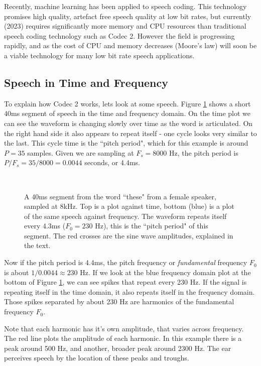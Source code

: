 \documentclass{article}
\begin{document}
{Recently, machine learning has been applied to speech coding.  This technology promises high quality, artefact free speech quality at low bit rates, but currently (2023) requires significantly more memory and CPU resources than traditional speech coding technology such as Codec 2.  However the field is progressing rapidly, and as the cost of CPU and memory decreases (Moore's law) will soon be a viable technology for many low bit rate speech applications.

\subsection{Speech in Time and Frequency}

To explain how Codec 2 works, lets look at some speech. Figure \ref{fig:hts2a_time} shows a short 40ms segment of speech in the time and frequency domain.  On the time plot we can see the waveform is changing slowly over time as the word is articulated.  On the right hand side it also appears to repeat itself - one cycle looks very similar to the last.  This cycle time is the ``pitch period", which for this example is around $P=35$ samples.  Given we are sampling at $F_s=8000$ Hz, the pitch period is $P/F_s=35/8000=0.0044$ seconds, or 4.4ms.

\begin{figure} [H]
\caption{ A 40ms segment from the word ``these" from a female speaker, sampled at 8kHz. Top is a plot against time, bottom (blue) is a plot of the same speech against frequency. The waveform repeats itself every 4.3ms ($F_0=230$ Hz), this is the ``pitch period" of this segment.  The red crosses are the sine wave amplitudes, explained in the text.}
\label{fig:hts2a_time}
\begin{center}

\\

\end{center}
\end{figure}

Now if the pitch period is 4.4ms, the pitch frequency or \emph{fundamental} frequency $F_0$ is about $1/0.0044 \approx 230$ Hz.  If we look at the blue frequency domain plot at the bottom of Figure \ref{fig:hts2a_time}, we can see spikes that repeat every 230 Hz.  If the signal is repeating itself in the time domain, it also repeats itself in the frequency domain.  Those spikes separated by about 230 Hz are harmonics of the fundamental frequency $F_0$.

Note that each harmonic has it's own amplitude, that varies across frequency.  The red line plots the amplitude of each harmonic. In this example there is a peak around 500 Hz, and another, broader peak around 2300 Hz.  The ear perceives speech by the location of these peaks and troughs.

}
\end{document}
